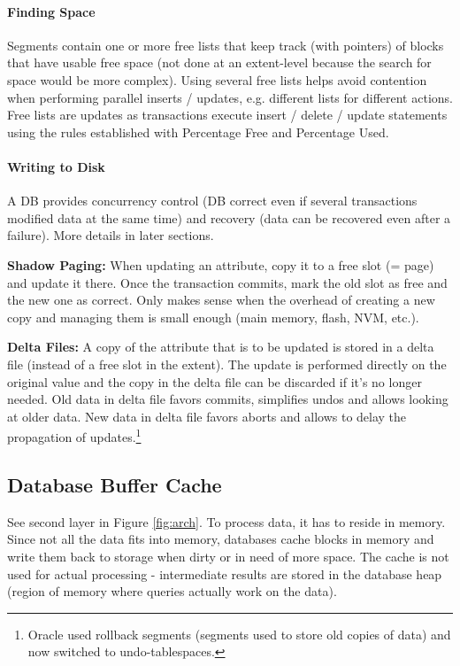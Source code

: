 \paragraph{Finding Space}
Segments contain one or more free lists that keep track (with pointers) of blocks that have usable free space (not done at an extent-level because the search for space would be more complex). Using several free lists helps avoid contention when performing parallel inserts / updates, e.g. different lists for different actions. Free lists are updates as transactions execute insert / delete / update statements using the rules established with Percentage Free and Percentage Used.

\paragraph{Writing to Disk}
A DB provides concurrency control (DB correct even if several transactions modified data at the same time) and recovery (data can be recovered even after a failure). More details in later sections.

\textbf{Shadow Paging:} When updating an attribute, copy it to a free slot (= page) and update it there. Once the transaction commits, mark the old slot as free and the new one as correct. Only makes sense when the overhead of creating a new copy and managing them is small enough (main memory, flash, NVM, etc.).

\textbf{Delta Files:} A copy of the attribute that is to be updated is stored in a delta file (instead of a free slot in the extent). The update is performed directly on the original value and the copy in the delta file can be discarded if it's no longer needed. Old data in delta file favors commits, simplifies undos and allows looking at older data. New data in delta file favors aborts and allows to delay the propagation of updates.\footnote{Oracle used rollback segments (segments used to store old copies of data) and now switched to undo-tablespaces.}



\subsection{Database Buffer Cache}


See second layer in Figure \ref{fig:arch}. To process data, it has to reside in memory. Since not all the data fits into memory, databases cache blocks in memory and write them back to storage when dirty or in need of more space. The cache is not used for actual processing - intermediate results are stored in the database heap (region of memory where queries actually work on the data).


